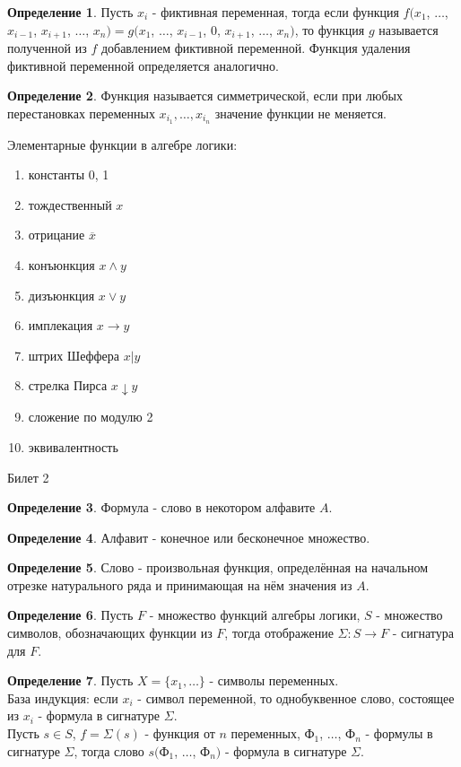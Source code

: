 \documentclass[a4paper, 12pt]{article}
\theoremstyle{definition}
\newtheorem*{definition}{Определение}
\theoremstyle{plain}
\theoremstyle{remark}
\begin{document}
  \begin{definition}
    Пусть $x_i$ - фиктивная переменная, тогда если функция $f(x_1$, $\ldots$, $x_{i-1}$, $x_{i+1}$, $\ldots$, $x_n)=g(x_1$, $\ldots$, $x_{i-1}$, $0$, $x_{i+1}$, $\ldots$, $x_n)$, то функция $g$ называется полученной из $f$ добавлением фиктивной переменной. Функция удаления фиктивной переменной определяется аналогично.
  \end{definition}
  \begin{definition}
    Функция называется симметрической, если при любых перестановках переменных $x_{i_1}, \ldots, x_{i_n}$ значение функции не меняется.
  \end{definition}
  Элементарные функции в алгебре логики:
  \begin{enumerate}
    \item константы 0, 1
    \item тождественный $x$
    \item отрицание $\overline{x}$
    \item конъюнкция $x\wedge y$
    \item дизъюнкция $x\vee y$
    \item имплекация $x\rightarrow y$
    \item штрих Шеффера $x|y$
    \item стрелка Пирса $x\downarrow y$
    \item сложение по модулю 2
    \item эквивалентность
  \end{enumerate}
  \begin{center}
    Билет 2
  \end{center}
  \begin{definition}
    Формула - слово в некотором алфавите $A$.
  \end{definition}
  \begin{definition}
    Алфавит - конечное или бесконечное множество.
  \end{definition}
  \begin{definition}
    Слово - произвольная функция, определённая на начальном отрезке натурального ряда и принимающая на нём значения из $A$.
  \end{definition}
  \begin{definition}
    Пусть $F$ - множество функций алгебры логики, $S$ - множество символов, обозначающих функции из $F$, тогда отображение $\Sigma : S \to F$ - сигнатура для $F$.
  \end{definition}
  \begin{definition}
    Пусть $X=\{x_1, \ldots\}$ - символы переменных.\\
    База индукция: если $x_i$ - символ переменной, то однобуквенное слово, состоящее из $x_i$ - формула в сигнатуре $\Sigma$.\\
    Пусть $s\in S$, $f=\Sigma(s)$ - функция от $n$ переменных, Ф$_1$, $\ldots$, Ф$_n$ - формулы в сигнатуре $\Sigma$, тогда слово $s($Ф$_1$, $\ldots$, Ф$_n)$ - формула в сигнатуре $\Sigma$.  
  \end{definition}
\end{document}
